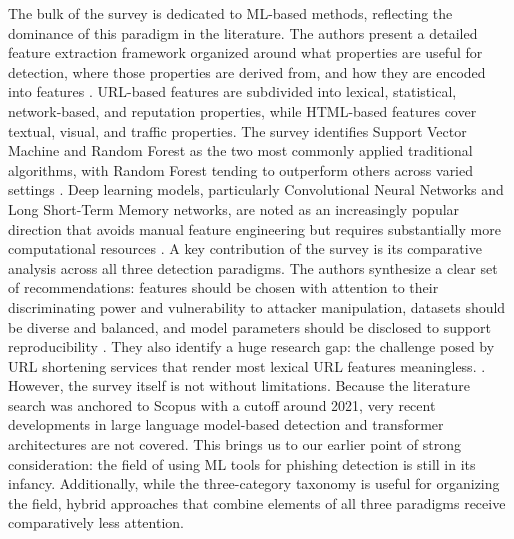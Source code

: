 \documentclass[conference]{IEEEtran}
\begin{document}
The bulk of the survey is dedicated to ML-based methods, reflecting the dominance of this paradigm in the literature. The authors present a detailed feature extraction framework organized around what properties are useful for detection, where those properties are derived from, and how they are encoded into features \cite{zieni_phishing_2023}. URL-based features are subdivided into lexical, statistical, network-based, and reputation properties, while HTML-based features cover textual, visual, and traffic properties. The survey identifies Support Vector Machine and Random Forest as the two most commonly applied traditional algorithms, with Random Forest tending to outperform others across varied settings \cite{zieni_phishing_2023}. Deep learning models, particularly Convolutional Neural Networks and Long Short-Term Memory networks, are noted as an increasingly popular direction that avoids manual feature engineering but requires substantially more computational resources \cite{zieni_phishing_2023}.
A key contribution of the survey is its comparative analysis across all three detection paradigms. The authors synthesize a clear set of recommendations: features should be chosen with attention to their discriminating power and vulnerability to attacker manipulation, datasets should be diverse and balanced, and model parameters should be disclosed to support reproducibility \cite{zieni_phishing_2023}. They also identify a huge research gap: the challenge posed by URL shortening services that render most lexical URL features meaningless. \cite{zieni_phishing_2023}.
However, the survey itself is not without limitations. Because the literature search was anchored to Scopus with a cutoff around 2021, very recent developments in large language model-based detection and transformer architectures are not covered. This brings us to our earlier point of strong consideration: the field of using ML tools for phishing detection is still in its infancy. Additionally, while the three-category taxonomy is useful for organizing the field, hybrid approaches that combine elements of all three paradigms receive comparatively less attention.
\end{document}
